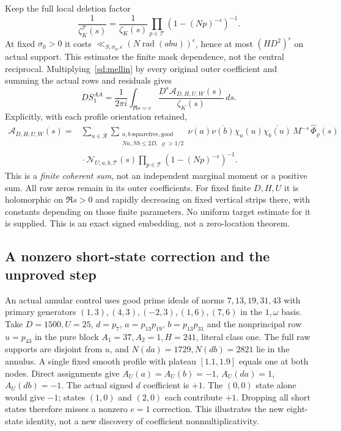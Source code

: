 \documentclass[11pt]{article}
\theoremstyle{definition}\newtheorem{definition}[theorem]{Definition}
\theoremstyle{remark}\newtheorem{remark}[theorem]{Remark}
\begin{document}
Keep the full local deletion factor
\[
 \frac1{\zeta_K^{\mathcal T}(s)}=
 \frac1{\zeta_K(s)}\prod_{p\in\mathcal T}(1-(Np)^{-s})^{-1}.
\]
At fixed $\sigma_0>0$ it costs
$\ll_{S,\sigma_0,\epsilon}(N\operatorname{rad}(abu))^\epsilon$,
hence at most $(HD^2)^\epsilon$ on actual support.
This estimates the finite mask dependence, not the central reciprocal.
Multiplying~\eqref{sd:mellin} by every original outer coefficient and
summing the actual rows and residuals gives
\begin{equation}\label{sd:coherent}
 DS_1^{AA}=\frac1{2\pi i}\int_{\Re s=c}
                   \frac{D^s\mathcal A_{D,H,U,W}(s)}{\zeta_K(s)}\,ds.
\end{equation}
Explicitly, with each profile orientation retained,
\[
 \begin{split}
 \mathcal A_{D,H,U,W}(s)
 ={}&\sum_{u\in\mathcal R}
 \sum_{\substack{a,b\ \mathrm{squarefree,good}\\Na,Nb\le2D,\ \varrho>1/2}}
 \nu(a)\overline{\nu(b)}\chi_a(u)\overline{\chi_b(u)}\,M^{-s}\,\widehat\Phi_\varrho(s)\\
 &{}\cdot\mathcal N_{U;a,b,\mathcal T}(s)
       \prod_{p\in\mathcal T}(1-(Np)^{-s})^{-1}.
 \end{split}
\]
This is a \emph{finite coherent sum}, not an independent marginal
moment or a positive sum. All raw zeros remain in its outer coefficients.
For fixed finite $D,H,U$ it is holomorphic on $\Re s>0$ and rapidly
decreasing on fixed vertical strips there, with constants depending on
those finite parameters. No uniform target estimate for it is supplied.
This is an exact signed embedding, not a zero-location theorem.

\subsection{A nonzero short-state correction and the unproved step}
An actual annular control uses good prime ideals of norms
$7,13,19,31,43$ with primary generators
$(1,3),(4,3),(-2,3),(1,6),(7,6)$ in the $1,\omega$ basis.
Take $D=1500,U=25$, $d=p_7$, $a=p_{13}p_{19}$,
$b=p_{13}p_{31}$ and the nonprincipal row $u=p_{43}$ in the pure block
$A_1=37,A_2=1,H=241$, literal class one.
The full raw supports are disjoint from $u$, and
$N(da)=1729,N(db)=2821$ lie in the annulus. A single fixed smooth
profile with plateau $[1.1,1.9]$ equals one at both nodes.
Direct assignments give
$A_U(a)=A_U(b)=-1$, $A_U(da)=1$, $A_U(db)=-1$.
The actual signed $d$ coefficient is $+1$. The $(0,0)$ state alone
would give $-1$; states $(1,0)$ and $(2,0)$ each contribute $+1$.
Dropping all short states therefore misses a nonzero $e=1$ correction.
This illustrates the new eight-state identity, not a new discovery of
coefficient nonmultiplicativity.
\end{document}
